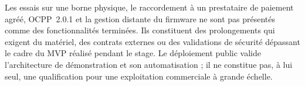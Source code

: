 Les essais sur une borne physique, le raccordement à un prestataire de paiement agréé,
OCPP~2.0.1 et la gestion distante du firmware ne sont pas
présentés comme des fonctionnalités terminées. Ils constituent des prolongements qui
exigent du matériel, des contrats externes ou des validations de sécurité dépassant le
cadre du MVP réalisé pendant le stage. Le déploiement public valide l'architecture de
démonstration et son automatisation ; il ne constitue pas, à lui seul, une qualification
pour une exploitation commerciale à grande échelle.
